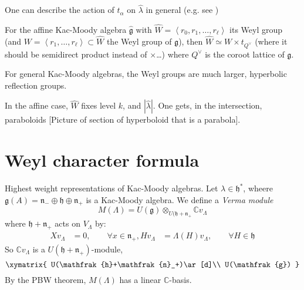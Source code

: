 One can describe the action of $t_\alpha$ on $\hat{\lambda}$ in general 
(e.g. see \cite[Chapter 6]{IDLA})

\begin{proposition}
\label{proposition-Weyl-group-of-affine-Kac-Moody-algebra}
For the affine Kac-Moody algebra $\hat{\mathfrak{g}}$
 with $\hat{W}=\left<r_0,r_1,\ldots,r_\ell\right>$ its Weyl group 
(and $W=\left<r_1,\ldots,r_\ell\right>\subset \hat{W}$ the Weyl group of
$\mathfrak{g}$), then $\hat{W} \simeq W\times t_{Q^\vee}$ (where it should be
semidirect product instead of $\times$…) where $Q^\vee$ is the
coroot lattice of $\mathfrak{g}$.
\end{proposition}

\begin{remark}
\label{remark-Weyl-groups-are-large-for-other-Kac-Moody-algebras}
For general Kac-Moody algebras, the Weyl groups are much larger, hyperbolic
reflection groups.
\end{remark}

In the affine case, $\hat{W}$ fixes level $k$, and $|\hat{\lambda}|$. One gets,
in the intersection, paraboloids [Picture of section of hyperboloid that is a
parabola].

\section{Weyl character formula}
\label{section-Weyl-character-formula}
Highest weight representations of Kac-Moody algebras. 
Let $\lambda \in \mathfrak{h}^*$, wheere
$\mathfrak{g}(A)=\mathfrak{n}_-\oplus\mathfrak{h}\oplus \mathfrak{n}_+$ 
is a Kac-Moody algebra. We define a {\it Verma module} 
$$
M(\Lambda)
=U(\mathfrak{g}) \otimes_{U(\mathfrak{h}+\mathfrak{n}_+}\mathbb{C}v_\Lambda
$$
where $\mathfrak{h}+\mathfrak{n}_+$ acts on $V_\Lambda$ by:
\begin{align*}
Xv_\Lambda&=0,\qquad \forall x \in \mathfrak{n}_+,
Hv_\Lambda&=\Lambda(H)v_\Lambda,\qquad \forall H \in \mathfrak{h}
\end{align*}
So $\mathbb{C} v_\Lambda$ is a $U(\mathfrak{h}+\mathfrak{n}_+)$-module,
$$
\xymatrix{
U(\mathfrak{h}+\mathfrak{n}_+)\ar[d]\\
U(\mathfrak{g})
}
$$
By the PBW theorem, $M(\Lambda)$ has a linear $\mathbb{C}$-basis.

